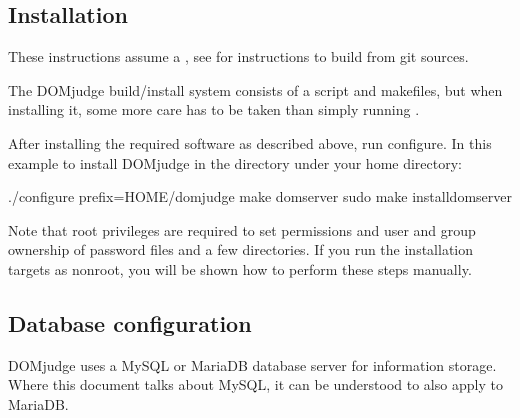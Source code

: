 \documentclass[a4paper,10pt,english,openany]{sphinxmanual}
\begin{document}
\begin{sphinxVerbatim}[commandchars=\\\{\}]
        \PYGZbs{}
           \PYGZbs{}
         
\end{sphinxVerbatim}


\subsection{Installation}
\label{\detokenize{install-domserver:installation}}
\sphinxAtStartPar
These instructions assume a , see {\hyperref[\detokenize{develop:bootstrap}]{}}
for instructions to build from git sources.

\sphinxAtStartPar
The DOMjudge build/install system consists of a 
script and makefiles, but when installing it, some more care has to be
taken than simply running .

\sphinxAtStartPar
After installing the required software as described above, run configure.
In this example to install DOMjudge in the directory  under
your home directory:

\begin{sphinxVerbatim}[commandchars=\\\{\}]
./configure \PYGZhy{}\PYGZhy{}prefix=\PYGZdl{}HOME/domjudge
make domserver
sudo make install\PYGZhy{}domserver
\end{sphinxVerbatim}

\sphinxAtStartPar
Note that root privileges are required to set permissions and user and
group ownership of password files and a few directories. If you run
the installation targets as non\sphinxhyphen{}root, you will be shown how to perform
these steps manually.


\subsection{Database configuration}
\label{\detokenize{install-domserver:database-configuration}}
\sphinxAtStartPar
DOMjudge uses a MySQL or MariaDB database server for information storage.
Where this document talks about MySQL, it can be understood to also apply
to MariaDB.
\end{document}
